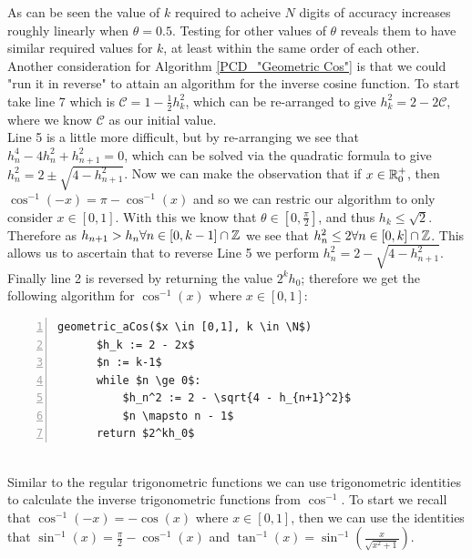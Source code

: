{As can be seen the value of \(k\) required to acheive \(N\) digits of accuracy increases roughly linearly when \(\theta = 0.5\). Testing for other values of \(\theta\) reveals them to have similar required values for \(k\), at least within the same order of each other.\\

Another consideration for Algorithm \ref{PCD_"Geometric Cos"} is that we could "run it in reverse" to attain an algorithm for the inverse cosine function. To start take line 7 which is \(\mathcal{C} = 1 - \frac{1}{2}h_k^2\), which can be re-arranged to give \(h_k^2 = 2 - 2\mathcal{C}\), where we know \(\mathcal{C}\) as our initial value.\\

Line 5 is a little more difficult, but by re-arranging we see that \(h_n^4 - 4h_n^2 + h_{n+1}^2 = 0\), which can be solved via the quadratic formula to give \(h_n^2 = 2 \pm \sqrt{4 - h_{n+1}^2}\). Now we can make the observation that if \(x \in \mathbb{R}^+_0\), then \(\cos^{-1}(-x) = \pi - \cos^{-1}(x)\) and so we can restric our algorithm to only consider \(x \in [0,1]\). With this we know that \(\theta \in [0,\frac{\pi}{2}]\), and thus \(h_k \le \sqrt{2}\). Therefore as \(h_{n+1} > h_n \forall n \in [0,k-1]\cap\mathbb{Z}\) we see that \(h_n^2 \le 2 \forall n \in [0,k]\cap\mathbb{Z}\). This allows us to ascertain that to reverse Line 5 we perform \(h_n^2 = 2 - \sqrt{4 - h_{n+1}^2}\).\\

Finally line 2 is reversed by returning the value \(2^kh_0\); therefore we get the following algorithm for \(\cos^{-1}(x)\) where \(x \in [0,1]\):

\begin{lstlisting}[numbers=left,frame=single,mathescape,caption={Geometric calculation of \(\cos^{-1}\)},label={PCD_"Geometric aCos"}]
  geometric_aCos($x \in [0,1], k \in \N$)
      $h_k := 2 - 2x$
      $n := k-1$
      while $n \ge 0$:
          $h_n^2 := 2 - \sqrt{4 - h_{n+1}^2}$
          $n \mapsto n - 1$
      return $2^kh_0$
\end{lstlisting}\\

Similar to the regular trigonometric functions we can use trigonometric identities to calculate the inverse trigonometric functions from \(\cos^{-1}\). To start we recall that \(\cos^{-1}(-x) = -\cos(x)\) where \(x \in [0,1]\), then we can use the identities that \(\sin^{-1}(x) = \frac{\pi}{2} - \cos^{-1}(x)\) and \(\tan^{-1}(x) = \sin^{-1}(\frac{x}{\sqrt{x^2 + 1}})\).\\

}
